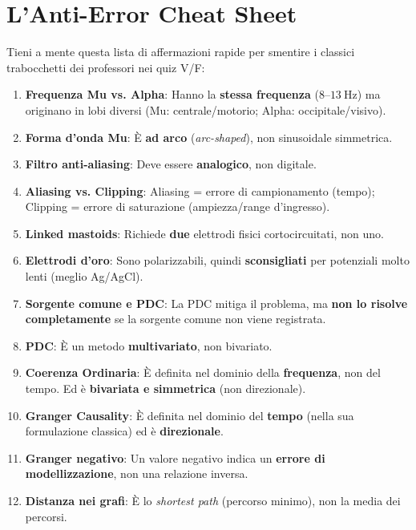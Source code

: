 \documentclass[10pt, letterpaper]{report}
\begin{document}
\chapter{L'Anti-Error Cheat Sheet}

Tieni a mente questa lista di affermazioni rapide per smentire i classici trabocchetti dei professori nei quiz V/F:

\begin{enumerate}
    \item \textbf{Frequenza Mu vs. Alpha}: Hanno la \textbf{stessa frequenza} (\(8\text{--}13\ \text{Hz}\)) ma originano in lobi diversi (Mu: centrale/motorio; Alpha: occipitale/visivo).
    \item \textbf{Forma d'onda Mu}: È \textbf{ad arco} (\emph{arc-shaped}), non sinusoidale simmetrica.
    \item \textbf{Filtro anti-aliasing}: Deve essere \textbf{analogico}, non digitale.
    \item \textbf{Aliasing vs. Clipping}: Aliasing = errore di campionamento (tempo); Clipping = errore di saturazione (ampiezza/range d'ingresso).
    \item \textbf{Linked mastoids}: Richiede \textbf{due} elettrodi fisici cortocircuitati, non uno.
    \item \textbf{Elettrodi d'oro}: Sono polarizzabili, quindi \textbf{sconsigliati} per potenziali molto lenti (meglio Ag/AgCl).
    \item \textbf{Sorgente comune e PDC}: La PDC mitiga il problema, ma \textbf{non lo risolve completamente} se la sorgente comune non viene registrata.
    \item \textbf{PDC}: È un metodo \textbf{multivariato}, non bivariato.
    \item \textbf{Coerenza Ordinaria}: È definita nel dominio della \textbf{frequenza}, non del tempo. Ed è \textbf{bivariata e simmetrica} (non direzionale).
    \item \textbf{Granger Causality}: È definita nel dominio del \textbf{tempo} (nella sua formulazione classica) ed è \textbf{direzionale}.
    \item \textbf{Granger negativo}: Un valore negativo indica un \textbf{errore di modellizzazione}, non una relazione inversa.
    \item \textbf{Distanza nei grafi}: È lo \emph{shortest path} (percorso minimo), non la media dei percorsi.

\end{enumerate}
\end{document}
